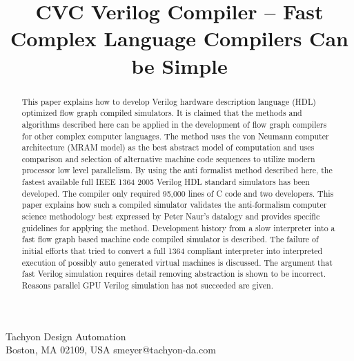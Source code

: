 \documentclass[preprint, authoryear]{sigplanconf}
\begin{document}
\title{CVC Verilog Compiler -- Fast Complex Language Compilers Can be Simple}


           {Tachyon Design Automation\\
           Boston, MA 02109, USA}
           {\mbox{smeyer@tachyon-da.com}}
\maketitle
\begin{abstract}
This paper explains how to develop Verilog hardware description language (HDL)
optimized flow graph compiled simulators.
It is claimed that the methods and algorithms described here can be
applied in the development of flow graph compilers for other
complex computer languages.  The method uses the von Neumann computer
architecture (MRAM model) as the best abstract model of computation
and uses comparison and selection of alternative machine code sequences
to utilize modern processor low level parallelism.
By using the anti formalist 
method described here, the fastest available full IEEE 1364 2005 Verilog
HDL standard simulators has been developed. 
The compiler only
required 95,000 lines of C code and two developers.
This paper explains how such a compiled simulator validates the anti-formalism
computer science methodology best expressed by Peter Naur's 
datalogy and provides specific guidelines for applying the method.
Development history from a slow interpreter into
a fast flow graph based machine code compiled simulator is described.
The failure of initial efforts that tried to convert a full 1364 compliant
interpreter into interpreted execution of possibly auto generated virtual
machines is discussed.  
The argument that fast Verilog simulation requires detail removing
abstraction is shown to be incorrect.
Reasons parallel GPU Verilog simulation has not succeeded are given.
\end{abstract}
\end{document}
